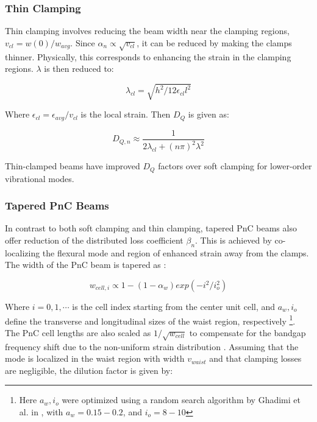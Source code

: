 \documentclass[%
 reprint,
nofootinbib,
 amsmath,amssymb,
 aps,
]{revtex4-2}
\begin{document}
\subsubsection{Thin Clamping}
Thin clamping involves reducing the beam width near the clamping regions, $v_{cl} = w(0)/w_{avg}$. Since $\alpha_n \propto \sqrt{v_{cl}}$, it can be reduced by making the clamps thinner. Physically, this corresponds to enhancing the strain in the clamping regions. $\lambda$ is then reduced to:

\begin{equation*}
    \lambda_{cl} = \sqrt{h^2 / 12 \epsilon_{cl} l^2}
\end{equation*}

Where $\epsilon_{cl} = \epsilon_{avg}/v_{cl}$ is the local strain. Then $D_Q$ is given as:

\begin{equation*}
    D_{Q,n} \approx \frac{1}{2\lambda_{cl} + (n\pi)^2 \lambda^2}
\end{equation*}

Thin-clamped beams have improved $D_Q$ factors over soft clamping for lower-order vibrational modes.

\subsubsection{Tapered PnC Beams}\label{PnC}
In contrast to both soft clamping and thin clamping, tapered PnC beams also offer reduction of the distributed loss coefficient $\beta_n$. This is achieved by co-localizing the flexural mode and region of enhanced strain away from the clamps. The width of the PnC beam is tapered as \cite{generalized_dissipation_dilution, ghadimi_main_paper}:

\begin{equation}\label{width tapering}
    w_{cell,i} \propto 1 - (1-\alpha_w) exp(-i^2/i_{o}^2)
\end{equation}

Where $i = 0, 1, \cdots$ is the cell index starting from the center unit cell, and $a_w, i_o$ define the transverse and longitudinal sizes of the waist region, respectively \footnote{Here $a_w, i_o$ were optimized using a random search algorithm by Ghadimi et al. in \cite{generalized_dissipation_dilution}, with $a_w = 0.15-0.2$, and $i_o = 8-10$}. The PnC cell lengths are also scaled as $1/\sqrt{w_{cell}}$ to compensate for the bandgap frequency shift due to the non-uniform strain distribution \cite{generalized_dissipation_dilution}. Assuming that the mode is localized in the waist region with width $v_{waist}$ and that clamping losses are negligible, the dilution factor is given by:
\end{document}
